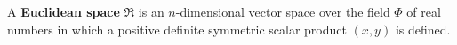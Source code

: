 A \textbf{Euclidean space} $\Re$ is an $n$-dimensional vector space over the field $\Phi$ of real numbers in which a positive definite symmetric scalar product $(x, y)$ is defined.

